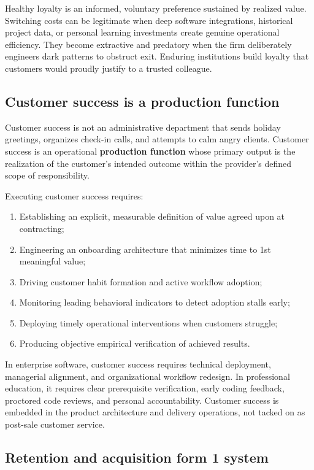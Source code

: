 Healthy loyalty is an informed, voluntary preference sustained by realized value. Switching costs can be legitimate when deep software integrations, historical project data, or personal learning investments create genuine operational efficiency. They become extractive and predatory when the firm deliberately engineers dark patterns to obstruct exit. Enduring institutions build loyalty that customers would proudly justify to a trusted colleague.

\subsection{Customer success is a production function}

Customer success is not an administrative department that sends holiday greetings, organizes check-in calls, and attempts to calm angry clients. Customer success is an operational \textbf{production function} whose primary output is the realization of the customer's intended outcome within the provider's defined scope of responsibility.

Executing customer success requires:
\begin{enumerate}
\item Establishing an explicit, measurable definition of value agreed upon at contracting;
\item Engineering an onboarding architecture that minimizes time to 1st meaningful value;
\item Driving customer habit formation and active workflow adoption;
\item Monitoring leading behavioral indicators to detect adoption stalls early;
\item Deploying timely operational interventions when customers struggle;
\item Producing objective empirical verification of achieved results.
\end{enumerate}
In enterprise software, customer success requires technical deployment, managerial alignment, and organizational workflow redesign. In professional education, it requires clear prerequisite verification, early coding feedback, proctored code reviews, and personal accountability. Customer success is embedded in the product architecture and delivery operations, not tacked on as post-sale customer service.

\subsection{Retention and acquisition form 1 system}

